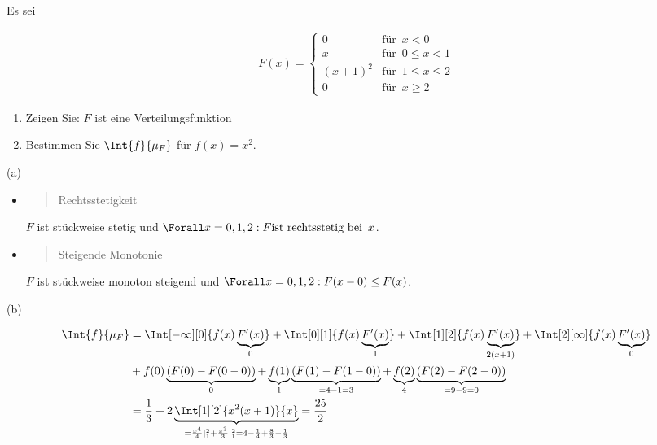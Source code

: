 
\begin{exercise}

Es sei

\begin{align*}
  F(x) =
  \begin{cases}
    0         & \text{für} \enspace x < 0 \\
    x         & \text{für} \enspace 0 \leq x < 1 \\
    (x + 1)^2 & \text{für} \enspace 1 \leq x \leq 2 \\
    0         & \text{für} \enspace x \geq 2
  \end{cases}
\end{align*}

\begin{enumerate}[label = (\alph*)]

  \item
  Zeigen Sie: $F$ ist eine Verteilungsfunktion
  
  \item
  Bestimmen Sie $\Int{f}{\mu_F}$ für $f(x) = x^2$.

\end{enumerate}

\end{exercise}


\begin{solution}

(a) \phantom{}

\begin{itemize}

  \item \blockquote{Rechtsstetigkeit}: $F$ ist stückweise stetig und $\Forall x = 0, 1, 2: F \text{ist rechtsstetig bei} \enspace x$.

  \item \blockquote{Steigende Monotonie}: $F$ ist stückweise monoton steigend und $\Forall x = 0, 1, 2: F(x - 0) \leq F(x)$.

\end{itemize}

(b)

\begin{align*}
  \Int{f}{\mu_F}
  & =
  \Int[-\infty][0]{f(x) \underbrace{F^\prime(x)}_0}
  +
  \Int[0][1]{f(x) \underbrace{F^\prime(x)}_1}
  +
  \Int[1][2]{f(x) \underbrace{F^\prime(x)}_{2 (x+1)}}
  +
  \Int[2][\infty]{f(x) \underbrace{F^\prime(x)}_0} \\
  & +
  f(0) \underbrace{(F(0) - F(0 - 0))}_0
  +
  \underbrace{f(1)}_1 \underbrace{(F(1) - F(1 - 0))}_{= 4-1 = 3}
  +
  \underbrace{f(2)}_4 \underbrace{(F(2) - F(2 - 0))}_{= 9-9 = 0} \\
  & =
  \frac{1}{3}
  +
  2 \underbrace
  {
    \Int[1][2]{x^2 (x + 1)}{x}
  }_{
    = \frac{x^4}{4} |_1^2 + \frac{x^3}{3} |_1^2
    = 4 - \frac{1}{4} + \frac{8}{3} - \frac{1}{3}
  }
  =
  \frac{25}{2}
\end{align*}

\end{solution}


